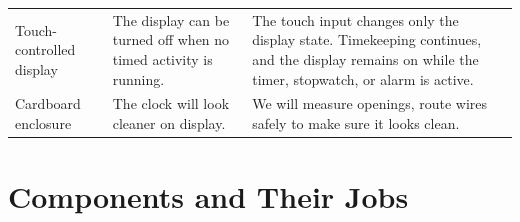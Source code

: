 \documentclass[12pt,letterpaper]{article}
\begin{document}
\begin{table}[H]
\begin{tabularx}{
    \textwidth
  }{
    @{}p{34mm}Y Y@{}
  }
    Touch-controlled display
    &
    The display can be turned off when no timed activity is running.
    &
    The touch input changes only the display state. Timekeeping
    continues, and the display remains on while the timer,
    stopwatch, or alarm is active.
    \\

    Cardboard enclosure
    &
    The clock will look cleaner on display.
    &
    We will measure openings,
    route wires safely to make sure it looks clean.
    \\

    \bottomrule

  \end{tabularx}

\end{table}

\section{Components and Their Jobs}
\end{document}

